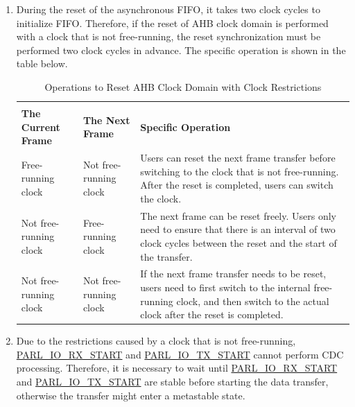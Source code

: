 \documentclass[main\_\_EN.tex]{subfiles}
\begin{document}
\begin{enumerate}
    \item During the reset of the asynchronous FIFO, it takes two clock cycles to initialize FIFO. Therefore, if the reset of AHB clock domain is performed with a clock that is not free-running, the reset synchronization must be performed two clock cycles in advance. The specific operation is shown in the table below.
    
    \begin{table}[H]
        \centering
        \caption{Operations to Reset AHB Clock Domain with Clock Restrictions}
        \label{tab:parlio-ahb-reset-clk-restriction}
        
        \begin{tabular}{|l|l|p{9cm}|}
        \hline
            \rowcolor{lightgray}
            \multicolumn{2}{|c|}{\textbf{Clock Restriction}} & \\
            \rowcolor{lightgray}
            \textbf{The Current Frame} & \textbf{The Next Frame} & \multirow{-2}{*}{\textbf{Specific Operation}} \\ \hline
        
            Free-running clock    & Not free-running clock  & Users can reset the next frame transfer before switching to the clock that is not free-running. After the reset is completed, users can switch the clock.    \\ \hline
            Not free-running clock  & Free-running clock    & The next frame can be reset freely. Users only need to ensure that there is an interval of two clock cycles between the reset and the start of the transfer.     \\ \hline
            Not free-running clock  & Not free-running clock  & If the next frame transfer needs to be reset, users need to first switch to the internal free-running clock, and then switch to the actual clock after the reset is completed.      \\ \hline
        \end{tabular}
    \end{table}
    
    \item Due to the restrictions caused by a clock that is not free-running, \hyperref[fielddesc:PARLIORXSTART]{PARL\_IO\_RX\_START} and \hyperref[fielddesc:PARLIOTXSTART]{PARL\_IO\_TX\_START} cannot perform CDC processing. Therefore, it is necessary to wait until \hyperref[fielddesc:PARLIORXSTART]{PARL\_IO\_RX\_START} and \hyperref[fielddesc:PARLIOTXSTART]{PARL\_IO\_TX\_START} are stable before starting the data transfer, otherwise the transfer might enter a metastable state. 
    

\end{enumerate}
\end{document}

